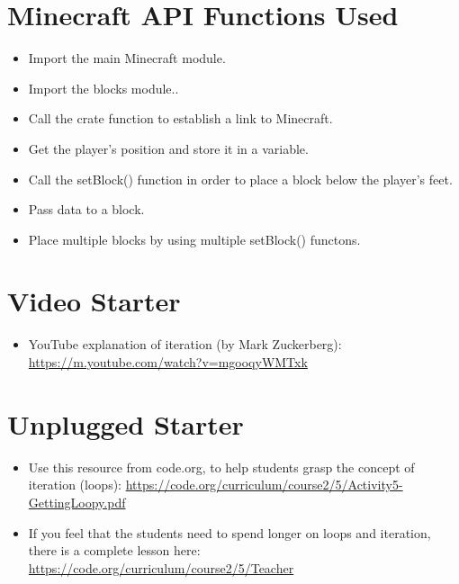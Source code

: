 \documentclass{geocraft-lesson-plan}
\begin{document}
\section*{Minecraft API Functions Used}
\begin{itemize}
\item Import the main Minecraft module.
\item Import the blocks module..
\item Call the crate function to establish a link to Minecraft.
\item Get the player's position and store it in a variable.
\item Call the setBlock() function in order to place a block below the player's feet.
\item Pass data to a block.
\item Place multiple blocks by using multiple setBlock() functons.
\end{itemize}

\section*{Video Starter}
\begin{itemize}
\item YouTube explanation of iteration (by Mark Zuckerberg):
 {\textcolor{greenish} 
  {\url{ https://m.youtube.com/watch?v=mgooqyWMTxk}}} 
\end{itemize}

\section*{Unplugged Starter}
\begin{itemize}
\item Use this resource from code.org, to help students grasp the concept of iteration (loops):  
  {\textcolor{greenish}
    {\url{https://code.org/curriculum/course2/5/Activity5-GettingLoopy.pdf}}} 
\item If you feel that the students need to spend longer on loops and iteration, there is a complete lesson here:  
  {\textcolor{greenish}
    {\url{https://code.org/curriculum/course2/5/Teacher}}} 
\end{itemize}
\end{document}
